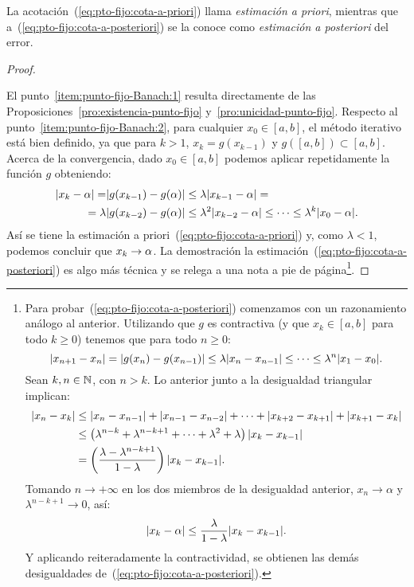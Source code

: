 La acotación~(\ref{eq:pto-fijo:cota-a-priori}) llama
\textit{estimación a priori}, mientras que
a~(\ref{eq:pto-fijo:cota-a-posteriori}) se la conoce como
\textit{estimación a posteriori} del error.

\begin{proof}~\par
  El punto~\ref{item:punto-fijo-Banach:1} resulta
  directamente de las Proposiciones~\ref{pro:existencia-punto-fijo}
  y~\ref{pro:unicidad-punto-fijo}. Respecto al
  punto~\ref{item:punto-fijo-Banach:2}, para cualquier $x_0\in [a,b]$,
  el método iterativo está bien definido, ya que para $k>1$,
  $x_{k}=g(x_{k-1})$ y $g([a,b])\subset [a,b]$. Acerca de la
  convergencia, dado $x_0\in [a,b]$ podemos aplicar repetidamente la
  función $g$ obteniendo:
  \begin{equation}
    \begin{aligned}
      |x_k-\alpha| = &|g(x_{k-1})-g(\alpha)| \le \lambda
      |x_{k-1}-\alpha| = \\
      = \lambda &|g(x_{k-2})-g(\alpha)| \le \lambda^2
      |x_{k-2}-\alpha| \le \cdots \le \lambda^k |x_0-\alpha|.
    \end{aligned}\label{eq:1}
  \end{equation}
  Así se tiene la estimación a
  priori~(\ref{eq:pto-fijo:cota-a-priori}) y, como
  $\lambda<1$, podemos concluir que $x_k\to\alpha$.
  La demostración la estimación~(\ref{eq:pto-fijo:cota-a-posteriori})
  es algo más técnica y se relega a una nota a pie de página\footnote{
    Para probar~(\ref{eq:pto-fijo:cota-a-posteriori}) comenzamos con
    un razonamiento análogo al anterior. Utilizando que $g$ es
    contractiva (y que $x_k\in [a,b]$ para todo $k\ge 0$) tenemos que
    para todo $n \ge 0$:
    \begin{equation*}
      |x_{n+1}-x_{n}| =
      |g(x_{n})-g(x_{n-1})|\le\lambda|x_{n}-x_{n-1}| \le \cdots \le \lambda^n|x_1-x_0|.
    \end{equation*}
    Sean $k,n\in\operatorname{{\mathbb N}}$, con $n>k$. Lo anterior junto a la
    desigualdad triangular implican:
    \begin{align*}
      |x_n-x_k| &\le |x_n-x_{n-1}| + |x_{n-1}-x_{n-2}| + \cdots +
                  |x_{k+2}-x_{k+1}| + |x_{k+1}-x_{k}|
      \\
                &\le \left(\lambda^{n-k} + \lambda^{n-k+1} +\cdots+
                  \lambda^{2} + \lambda \right) |x_k-x_{k-1}|
      \\
                &=\left(\frac{\lambda-\lambda^{n-k+1}}{1-\lambda}\right)
                  |x_{k}-x_{k-1}|.
    \end{align*}
    Tomando $n\to+\infty$ en los dos miembros de la desigualdad
    anterior, $x_n\to\alpha$ y $\lambda^{n-k+1}\to 0$, así:
    $$
    |x_k-\alpha| \le \frac{\lambda}{1-\lambda}
    |x_{k}-x_{k-1}|.
    $$
    Y aplicando reiteradamente la contractividad, se obtienen las
    demás desigualdades de~(\ref{eq:pto-fijo:cota-a-posteriori}).
  }.
\end{proof}

